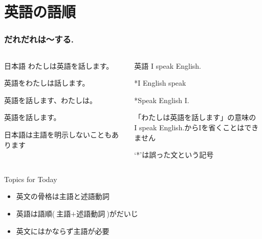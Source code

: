 \documentclass[aspectratio=169,xcolor={dvipsnames,table}]{beamer}
\begin{document}
\section{英語の語順}
\begin{frame}[plain]\frametitle{だれだれは〜する.}

\begin{columns}
\begin{column}[t]{.45\textwidth}
\begin{block}{日本語}
わたしは英語を話します。\pause

英語をわたしは話します。\pause

英語を話します、わたしは。\pause

英語を話します。

\hfill{\scriptsize 日本語は主語を明示しないこともあります}
\end{block}
\end{column}
\pause
\begin{column}[t]{.45\textwidth}
\begin{alertblock}{英語}
I speak English.\pause

\mbox{}\hspace{75pt}*I English speak\pause

\mbox{}\hspace{75pt}*Speak English I.\pause

\bigskip

{\scriptsize 「わたしは英語を話します」の意味の\\[-5pt]I speak English.からIを省くことはできません}

\scriptsize
\mbox{}\hspace{75pt}%
`*'は誤った文という記号　
\end{alertblock}
\end{column}
\end{columns}


\bigskip
\pause
\begin{exampleblock}{Topics for Today}
\begin{itemize}
 \item   英文の骨格は主語と述語動詞
 \item   英語は語順($\text{主語}+\text{述語動詞}$)がだいじ
 \item   英文にはかならず主語が必要
\end{itemize}
     \end{exampleblock}
\end{frame}
\end{document}
